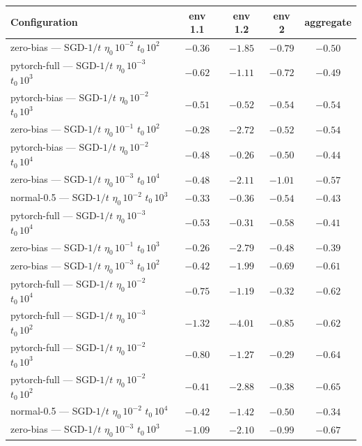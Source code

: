 \begin{table}[H]
\centering
\scriptsize
\setlength{\tabcolsep}{4pt}
\renewcommand{\arraystretch}{1.0}
\begin{tabular}{@{}>{\raggedright\arraybackslash}p{5.2cm} cccc@{}}
\toprule
\textbf{Configuration} & \textbf{env 1.1} & \textbf{env 1.2} & \textbf{env 2} & \textbf{aggregate} \\
\midrule
zero-bias --- SGD-$1/t$ $\eta_0\,10^{-2}$ $t_0\,10^{2}$ & $-0.36$ & $-1.85$ & $-0.79$ & \textbf{$-0.50$} \\
pytorch-full --- SGD-$1/t$ $\eta_0\,10^{-3}$ $t_0\,10^{3}$ & $-0.62$ & $-1.11$ & $-0.72$ & \underline{$-0.49$} \\
pytorch-bias --- SGD-$1/t$ $\eta_0\,10^{-2}$ $t_0\,10^{3}$ & \underline{$-0.51$} & \textbf{$-0.52$} & $-0.54$ & $-0.54$ \\
zero-bias --- SGD-$1/t$ $\eta_0\,10^{-1}$ $t_0\,10^{2}$ & $-0.28$ & $-2.72$ & $-0.52$ & $-0.54$ \\
pytorch-bias --- SGD-$1/t$ $\eta_0\,10^{-2}$ $t_0\,10^{4}$ & $-0.48$ & $-0.26$ & \textbf{$-0.50$} & $-0.44$ \\
zero-bias --- SGD-$1/t$ $\eta_0\,10^{-3}$ $t_0\,10^{4}$ & $-0.48$ & $-2.11$ & $-1.01$ & $-0.57$ \\
normal-0.5 --- SGD-$1/t$ $\eta_0\,10^{-2}$ $t_0\,10^{3}$ & $-0.33$ & $-0.36$ & $-0.54$ & $-0.43$ \\
pytorch-full --- SGD-$1/t$ $\eta_0\,10^{-3}$ $t_0\,10^{4}$ & $-0.53$ & $-0.31$ & $-0.58$ & $-0.41$ \\
zero-bias --- SGD-$1/t$ $\eta_0\,10^{-1}$ $t_0\,10^{3}$ & $-0.26$ & $-2.79$ & $-0.48$ & $-0.39$ \\
zero-bias --- SGD-$1/t$ $\eta_0\,10^{-3}$ $t_0\,10^{2}$ & $-0.42$ & $-1.99$ & $-0.69$ & $-0.61$ \\
pytorch-full --- SGD-$1/t$ $\eta_0\,10^{-2}$ $t_0\,10^{4}$ & $-0.75$ & $-1.19$ & $-0.32$ & $-0.62$ \\
pytorch-full --- SGD-$1/t$ $\eta_0\,10^{-3}$ $t_0\,10^{2}$ & $-1.32$ & $-4.01$ & $-0.85$ & $-0.62$ \\
pytorch-full --- SGD-$1/t$ $\eta_0\,10^{-2}$ $t_0\,10^{3}$ & $-0.80$ & $-1.27$ & $-0.29$ & $-0.64$ \\
pytorch-full --- SGD-$1/t$ $\eta_0\,10^{-2}$ $t_0\,10^{2}$ & $-0.41$ & $-2.88$ & $-0.38$ & $-0.65$ \\
normal-0.5 --- SGD-$1/t$ $\eta_0\,10^{-2}$ $t_0\,10^{4}$ & $-0.42$ & $-1.42$ & \underline{$-0.50$} & $-0.34$ \\
zero-bias --- SGD-$1/t$ $\eta_0\,10^{-3}$ $t_0\,10^{3}$ & $-1.09$ & $-2.10$ & $-0.99$ & $-0.67$ \\

\end{tabular}
\end{table}
